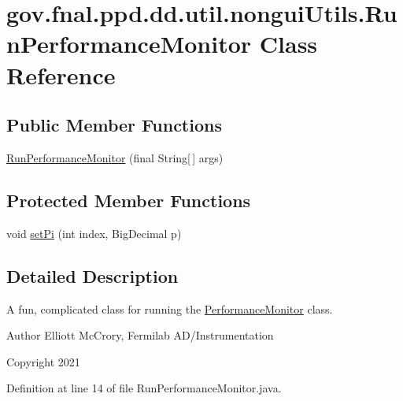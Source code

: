 \hypertarget{classgov_1_1fnal_1_1ppd_1_1dd_1_1util_1_1nonguiUtils_1_1RunPerformanceMonitor}{\section{gov.\-fnal.\-ppd.\-dd.\-util.\-nongui\-Utils.\-Run\-Performance\-Monitor Class Reference}
\label{classgov_1_1fnal_1_1ppd_1_1dd_1_1util_1_1nonguiUtils_1_1RunPerformanceMonitor}
}
\subsection*{Public Member Functions}
\begin{DoxyCompactItemize}
\item 
\hyperlink{classgov_1_1fnal_1_1ppd_1_1dd_1_1util_1_1nonguiUtils_1_1RunPerformanceMonitor_ac64ac1b5d22b87982e52cff36eac87a4}{Run\-Performance\-Monitor} (final String\mbox{[}$\,$\mbox{]} args)
\end{DoxyCompactItemize}
\subsection*{Protected Member Functions}
\begin{DoxyCompactItemize}
\item 
void \hyperlink{classgov_1_1fnal_1_1ppd_1_1dd_1_1util_1_1nonguiUtils_1_1RunPerformanceMonitor_a82aee216128f10896708fbfa438cefa0}{set\-Pi} (int index, Big\-Decimal p)
\end{DoxyCompactItemize}


\subsection{Detailed Description}
A fun, complicated class for running the \hyperlink{classgov_1_1fnal_1_1ppd_1_1dd_1_1util_1_1nonguiUtils_1_1PerformanceMonitor}{Performance\-Monitor} class.

\begin{DoxyAuthor}{Author}
Elliott Mc\-Crory, Fermilab A\-D/\-Instrumentation 
\end{DoxyAuthor}
\begin{DoxyCopyright}{Copyright}
2021 
\end{DoxyCopyright}


Definition at line 14 of file Run\-Performance\-Monitor.\-java.



